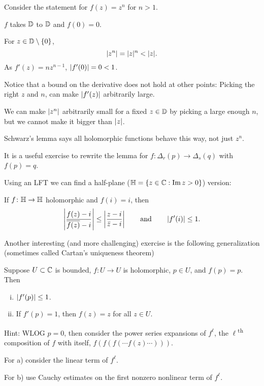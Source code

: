 \documentclass[10pt,aspectratio=169]{beamer}
\begin{document}
\begin{frame}
Consider the statement for $f(z) = z^n$ for $n > 1$.

\pause
\medskip

$f$ takes ${\mathbb{D}}$ to ${\mathbb{D}}$ and $f(0) = 0$.

\pause
\medskip

For $z \in {\mathbb{D}} \setminus \{ 0 \}$,
\[
\lvert {z^n} \rvert =
\lvert {z} \rvert^n < \lvert {z} \rvert .
\]
\pause
As $f'(z) = n z^{n-1}$,
$\lvert {f'(0)} \rvert = 0 < 1$.

\pause
\medskip

Notice that a bound on the derivative does not hold at other points:
Picking the right $z$ and $n$,
can make $\lvert {f'(z)} \rvert$ arbitrarily large.

\medskip
\pause

We can make $\lvert {z^n} \rvert$ arbitrarily small for a fixed $z \in {\mathbb{D}}$ by picking
a large enough $n$, but we cannot make it bigger than $\lvert {z} \rvert$.

\medskip
\pause

Schwarz's lemma says all holomorphic functions
behave this way, not just $z^n$.
\end{frame}

\begin{frame}
It is a useful exercise to rewrite the lemma for
$f \colon \Delta_r(p) \to \Delta_s(q)$ with $f(p)=q$.

\medskip
\pause

Using an LFT we can find a half-plane (${\mathbb{H}} = \{ z \in {\mathbb{C}} : \operatorname{Im} z > 0 \}$)
version:

\medskip
\pause

If $f \colon {\mathbb{H}} \to {\mathbb{H}}$ holomorphic and $f(i) = i$, then
\[
\left\lvert {\frac{f(z)-i}{\overline{f(z)}-i}} \right\rvert \leq
\left\lvert {\frac{z-i}{\bar{z}-i}} \right\rvert 
\qquad
\text{and}
\qquad
\left\lvert {f'(i)} \right\rvert \leq 1 .
\]

\medskip
\pause
Another interesting (and more challenging) exercise is the following
generalization (sometimes called Cartan's uniqueness theorem)

\medskip
\pause

Suppose $U \subset {\mathbb{C}}$ is bounded, $f \colon U \to U$ is holomorphic, $p \in U$,
and $f(p)=p$.  Then
\begin{enumerate}[(i)]
\item
$\left\lvert {f'(p)} \right\rvert \leq 1$.
\item
If $f'(p) = 1$, then $f(z) = z$ for all $z \in U$.
\end{enumerate}
\pause
Hint: WLOG $p=0$,
\pause
then consider the power series
expansions of
$f^{\ell}$, the $\ell$\textsuperscript{th} composition of $f$ with itself,
$f(f(f(\cdots f(z) \cdots)))$.

\pause

For a) consider the linear term of $f^{\ell}$.

\pause

For b) use Cauchy estimates on the first nonzero nonlinear term of
$f^{\ell}$.

\end{frame}
\end{document}

